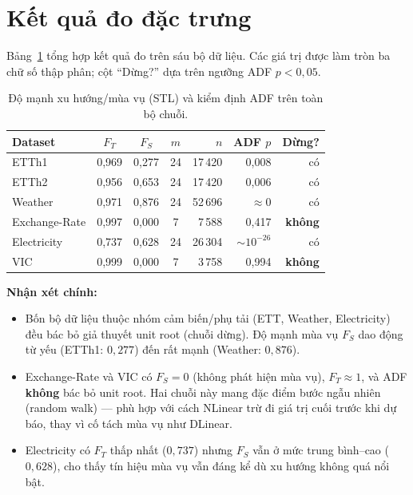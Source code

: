 \section{Kết quả đo đặc trưng}
\label{sec:results}

Bảng~\ref{tab:profiles} tổng hợp kết quả đo trên sáu bộ dữ liệu.
Các giá trị được làm tròn ba chữ số thập phân; cột ``Dừng?'' dựa trên
ngưỡng ADF \(p < 0{,}05\).

\begin{table}[H]
  \centering
  \caption{Độ mạnh xu hướng/mùa vụ (STL) và kiểm định ADF trên toàn bộ chuỗi.}
  \label{tab:profiles}
  \small
  \begin{tabular}{@{}lcccrrr@{}}
    \toprule
    Dataset & \(F_T\) & \(F_S\) & \(m\) & \(n\) & ADF \(p\) & Dừng? \\
    \midrule
    ETTh1         & 0{,}969 & 0{,}277 & 24 & 17\,420 & 0{,}008 & có \\
    ETTh2         & 0{,}956 & 0{,}653 & 24 & 17\,420 & 0{,}006 & có \\
    Weather       & 0{,}971 & 0{,}876 & 24 & 52\,696 & \(\approx 0\) & có \\
    Exchange-Rate & 0{,}997 & 0{,}000 & 7  & 7\,588  & 0{,}417 & \textbf{không} \\
    Electricity   & 0{,}737 & 0{,}628 & 24 & 26\,304 & \(\sim 10^{-26}\) & có \\
    VIC           & 0{,}999 & 0{,}000 & 7  & 3\,758  & 0{,}994 & \textbf{không} \\
    \bottomrule
  \end{tabular}
\end{table}

\noindent\textbf{Nhận xét chính:}
\begin{itemize}
  \item Bốn bộ dữ liệu thuộc nhóm cảm biến/phụ tải (ETT, Weather, Electricity)
        đều bác bỏ giả thuyết unit root (chuỗi dừng). Độ mạnh mùa vụ \(F_S\)
        dao động từ yếu (ETTh1: \(0{,}277\)) đến rất mạnh (Weather: \(0{,}876\)).
  \item Exchange-Rate và VIC có \(F_S = 0\) (không phát hiện mùa vụ),
        \(F_T \approx 1\), và ADF \textbf{không} bác bỏ unit root.
        Hai chuỗi này mang đặc điểm bước ngẫu nhiên (random walk) ---
        phù hợp với cách NLinear trừ đi giá trị cuối trước khi dự báo,
        thay vì cố tách mùa vụ như DLinear.
  \item Electricity có \(F_T\) thấp nhất (\(0{,}737\)) nhưng \(F_S\) vẫn
        ở mức trung bình--cao (\(0{,}628\)), cho thấy tín hiệu mùa vụ
        vẫn đáng kể dù xu hướng không quá nổi bật.
\end{itemize}
